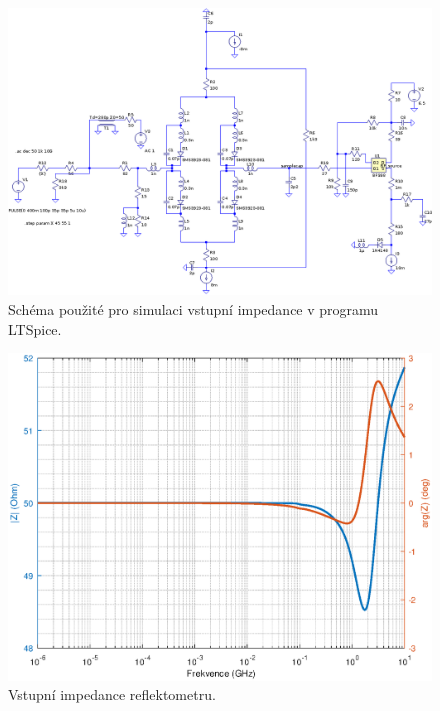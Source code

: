 \begin{figure}[htbp]
\includegraphics[width=\textwidth,keepaspectratio]{images/ltspice_schematic.eps}\caption{Schéma použité pro simulaci vstupní impedance v programu LTSpice.}\label{ltspice_schematic}
\end{figure}

\begin{figure}[htbp]
\includegraphics[width=\textwidth,keepaspectratio]{images/input_impedance.eps}\caption{Vstupní impedance reflektometru.}\label{input_impedance}
\end{figure}

